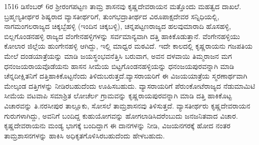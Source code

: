 1516 ಡಿಸೆಂಬರ್​ 6ರ ಶ‍್ರೀರಂಗಪಟ್ಟಣ ತಾಮ್ರ ಶಾಸನವು ಕೃಷ್ಣದೇವರಾಯನ ಮತ್ತೊಂದು ಮಹತ್ವದ ದಾಖಲೆ. ಬ್ರಹ್ಮಣ್ಯತೀರ್ಥರ ಶಿಷ್ಯರಾದ ವ್ಯಾಸತೀರ್ಥರಿಗೆ, ತುಂಗಭದ್ರಾತೀರ್ಥದ ವಿರೂಪಾಕ್ಷದೇವರ ಸನ್ನಿಧಿಯಲ್ಲಿ, ನಾಗಮಂಗಲ\-ರಾಜ್ಯದ ಚಿಕ್ಕಬ್ಬೆಹಳ್ಳಿ (ಇಂದಿನ ಚಿಕ್ಕಬಳ್ಳಿ), ಚನ್ನಪಟ್ಟಣರಾಜ್ಯದ ಹಲವುಮಾರಾದಿ ಹೊಸಹಳ್ಳಿ, ಬಿಲ್ಲಗೊಂಡನಹಳ್ಳಿ ರಾಜ್ಯದ ವೆಂಗೇನಹಳ್ಳಿಗಳನ್ನು ಸರ್ವಮಾನ್ಯವಾಗಿ ದತ್ತಿ ಹಾಕಿಕೊಡುತ್ತಾನೆ. ವೆಂಗೇನಹಳ್ಳಿಯು ಕೋಲಾರ ಜಿಲ್ಲೆಯ ಹುಂಗೇನಹಳ್ಳಿ ಆಗಿದ್ದು, ಇಲ್ಲಿ ಮಾಧ್ವರ ಮಠವಿದೆ. ಇದೇ ಕಾಲದಲ್ಲಿ ಕೃಷ್ಣರಾಯನು ಗಜಪತಿಯ ಮೇಲೆ ದಂಡಯಾತ್ರೆಯನ್ನು ಮಾಡಿ ಜಯಸ್ಥಂಭವನೆತ್ತಿಸಿ ಬರುವಾಗ, ಅವನ ದಳವಾಯಿ ತಿಮ್ಮರಾಜನ ಮಗ ಧನಂಜಯರಾಯವೊಡೆಯನು ಹಾಸನ ಸೀಮೆಯ ಬಿಟ್ಟಗೊಂಡನಹಳ್ಳಿಯನ್ನು ಧನಂಜಯಪುರವನ್ನಾಗಿ ಮಾಡಿ ಚೆನ್ನದೀಕ್ಷಿತನಿಗೆ ದತ್ತಿಹಾಕಿಕೊಟ್ಟನೆಂದು ತಿಳಿದುಬರುತ್ತದೆ.\break ವ್ಯಾಸರಾಯರಿಗೆ ಈ ವಿಜಯಯಾತ್ರೆಯ ಸ್ಮರಣಾರ್ಥವಾಗಿ ಮೇಲ್ಕಂಡ ದತ್ತಿಗಳನ್ನು ನೀಡಿರಬಹುದೆಂದು ಊಹಿಸಬಹುದು. ವ್ಯಾಸರಾಯರಿಗೆ ಪೆರುಂಕೋಟೆರಾಜ್ಯದ ನೆಡುಮಾಮಿಟಿ ಸೀಮೆಯ ವಟವಾಪಿ ಸಮಾಶ್ರಿತ ಲೋಚೆರ್ಲ ಗ್ರಾಮವನ್ನು ಕೃಷ್ಣರಾಯಪುರವನ್ನಾಗಿ ಮಾಡಿ ದತ್ತಿ ಹಾಕಿಕೊಟ್ಟ ವಿಚಾರವನ್ನು ತಿ.ನರಸೀಪುರ ತಾಲ್ಲೂಕು, ಸೋಸಲೆ ತಾಮ್ರಶಾಸನವು ತಿಳಿಸುತ್ತದೆ. ವ್ಯಾಸತೀರ್ಥರು ಕೃಷ್ಣದೇವರಾಯನ ಗುರುಗಳಾಗಿದ್ದು, ಅವನಿಗೆ ಬಂದಿದ್ದ ಕುಹುಯೋಗವನ್ನು ಹೋಗಲಾಡಿ\-ಸಿದರೆಂಬುದು ಜನಜನಿತವಾದ ವಿಚಾರ. ಕೃಷ್ಣದೇವರಾಯನು ಮಂಡ್ಯ ಭಾಗಕ್ಕೆ ಬಂದಿದ್ದಾಗ ಈ ದಾನಗಳನ್ನು ನೀಡಿ, ವಿಜಯನಗರಕ್ಕೆ ಹೋದ ನಂತರ ತಾಮ್ರಶಾಸನಗಳನ್ನು ಹಾಕಿಸಿ ಅಧಿಕೃತಗೊಳಿಸಿರ\-ಬಹುದೆಂದು ಹೇಳಬಹುದು.

